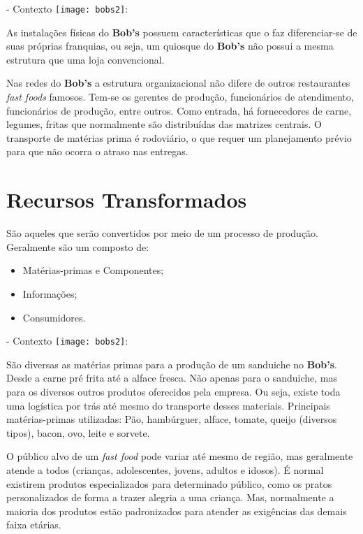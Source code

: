 		- Contexto \texttt{[image: bobs2]}:

		As instalações físicas do \textbf{Bob’s} possuem características que o faz diferenciar-se de suas próprias franquias, ou seja, um quiosque do \textbf{Bob’s} não possui a mesma estrutura que uma loja convencional.
		
		Nas redes do \textbf{Bob’s} a estrutura organizacional não difere de outros restaurantes \emph{fast foods} famosos. Tem-se os gerentes de produção, funcionários de atendimento, funcionários de produção, entre outros. Como entrada, há fornecedores de carne, legumes, fritas que normalmente são distribuídas das matrizes centrais. O transporte de matérias prima é rodoviário, o que requer um planejamento prévio para que não ocorra o atraso nas entregas.


	\section[Recursos Transformados]{Recursos Transformados}
	\label{sec:dados_transformados}

		São aqueles que serão convertidos por meio de um processo de produção. Geralmente são um composto de: 

		\begin{itemize}
			\item{Matérias-primas e Componentes;}
			\item{Informações;}
			\item{Consumidores.}
		\end{itemize}
		
		- Contexto \texttt{[image: bobs2]}:

		São diversas as matérias primas para a produção de um sanduiche no \textbf{Bob’s}. Desde a carne pré frita até a alface fresca. Não apenas para o sanduiche, mas para os diversos outros produtos oferecidos pela empresa. Ou seja, existe toda uma logística por trás até mesmo do transporte desses materiais. Principais matérias-primas utilizadas: Pão, hambúrguer, alface, tomate, queijo (diversos tipos), bacon, ovo, leite e sorvete.

		O público alvo de um \emph{fast food} pode variar até mesmo de região, mas geralmente atende a todos (crianças, adolescentes, jovens, adultos e idosos). É normal existirem produtos especializados para determinado público, como os pratos personalizados de forma a trazer alegria a uma criança. Mas, normalmente a maioria dos produtos estão padronizados para atender as exigências das demais faixa etárias.

